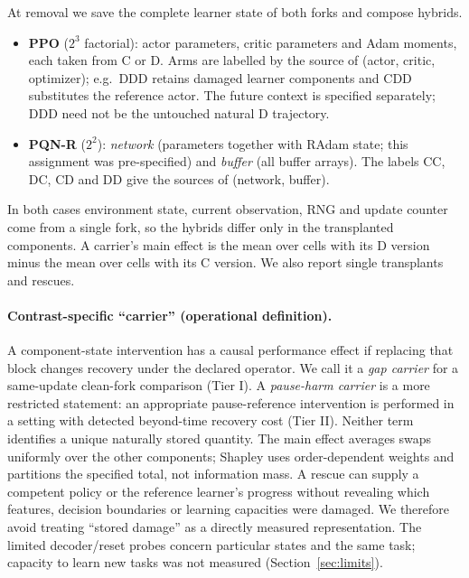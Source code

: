 \documentclass[10pt]{article} %
\begin{document}
At removal we save the complete learner state of both forks and compose hybrids.
\begin{itemize}
\item \textbf{PPO} ($2^3$ factorial): actor parameters, critic parameters and Adam moments, each taken from C or D. Arms are labelled by the source of (actor, critic, optimizer); e.g.\ DDD retains damaged learner components and CDD substitutes the reference actor. The future context is specified separately; DDD need not be the untouched natural D trajectory.
\item \textbf{PQN-R} ($2^2$): \emph{network} (parameters together with RAdam state; this assignment was pre-specified) and \emph{buffer} (all buffer arrays). The labels CC, DC, CD and DD give the sources of (network, buffer).
\end{itemize}
In both cases environment state, current observation, RNG and update counter come from a single fork, so the hybrids differ only in the transplanted components. A carrier's main effect is the mean over cells with its D version minus the mean over cells with its C version. We also report single transplants and rescues.

\paragraph{Contrast-specific ``carrier'' (operational definition).}
A component-state intervention has a causal performance effect if replacing that block changes recovery under the declared operator. We call it a \emph{gap carrier} for a same-update clean-fork comparison (Tier I). A \emph{pause-harm carrier} is a more restricted statement: an appropriate pause-reference intervention is performed in a setting with detected beyond-time recovery cost (Tier II). Neither term identifies a unique naturally stored quantity. The main effect averages swaps uniformly over the other components; Shapley uses order-dependent weights and partitions the specified total, not information mass. A rescue can supply a competent policy or the reference learner's progress without revealing which features, decision boundaries or learning capacities were damaged. We therefore avoid treating ``stored damage'' as a directly measured representation. The limited decoder/reset probes concern particular states and the same task; capacity to learn new tasks was not measured (Section~\ref{sec:limits}).
\end{document}
